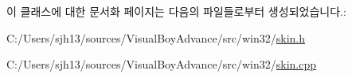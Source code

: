이 클래스에 대한 문서화 페이지는 다음의 파일들로부터 생성되었습니다.\+:\begin{DoxyCompactItemize}
\item 
C\+:/\+Users/sjh13/sources/\+Visual\+Boy\+Advance/src/win32/\mbox{\hyperlink{skin_8h}{skin.\+h}}\item 
C\+:/\+Users/sjh13/sources/\+Visual\+Boy\+Advance/src/win32/\mbox{\hyperlink{skin_8cpp}{skin.\+cpp}}\end{DoxyCompactItemize}
